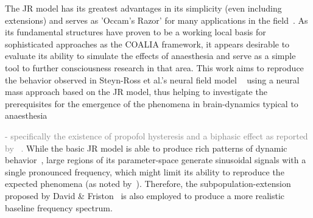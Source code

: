 The JR model has its greatest advantages in its simplicity (even including extensions) and serves as 'Occam's Razor'
for many applications in the field~\cite{kuhlmann_neural_2016}.
As its fundamental structures have proven to be a working local basis for sophisticated approaches as the COALIA
framework,
it appears desirable to evaluate its ability to simulate the effects of anaesthesia and serve as a simple tool to
further consciousness research in that area.
This work aims to reproduce the behavior observed in Steyn-Ross et al.'s neural field model ~\cite{hutt_progress_2011}
using a neural mass approach based on the JR model,
thus helping to investigate the prerequisites for the emergence of the phenomena in brain-dynamics typical to
anaesthesia

\textcolor{gray}{- specifically the existence of propofol hysteresis and a biphasic effect as reported by
~\cite{hutt_progress_2011}.} 
While the basic JR model is able to produce rich patterns of dynamic behavior~\cite{spiegler_bifurcation_2010},
large regions of its parameter-space generate sinusoidal signals with a single pronounced frequency,
which might limit its ability to reproduce the expected phenomena (as noted by~\cite{kuhlmann_neural_2016}).
Therefore, the subpopulation-extension proposed by David \& Friston~\cite{david_neural_2003} is also employed to
produce a more realistic baseline frequency spectrum.



%

%
%


